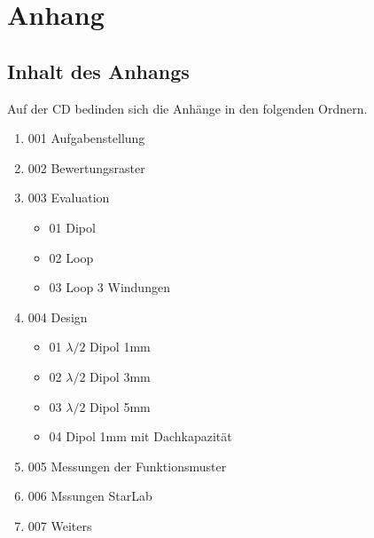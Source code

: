 \chapter{Anhang}
\section{Inhalt des Anhangs}
Auf der CD bedinden sich die Anhänge in den folgenden Ordnern.
\begin{enumerate}
\item[] 001 Aufgabenstellung
\item[] 002 Bewertungsraster
\item[] 003 Evaluation
	\begin{itemize}
		\item[] 01 Dipol
		\item[] 02 Loop
		\item[] 03 Loop 3 Windungen
	\end{itemize}
\item[] 004 Design
	\begin{itemize}
		\item[] 01 $\lambda/2$ Dipol 1mm
		\item[] 02 $\lambda/2$ Dipol 3mm
		\item[] 03 $\lambda/2$ Dipol 5mm
		\item[] 04 Dipol 1mm mit Dachkapazität
	\end{itemize}
\item[] 005 Messungen der Funktionsmuster
\item[] 006 Mssungen StarLab
\item[] 007 Weiters

\end{enumerate}